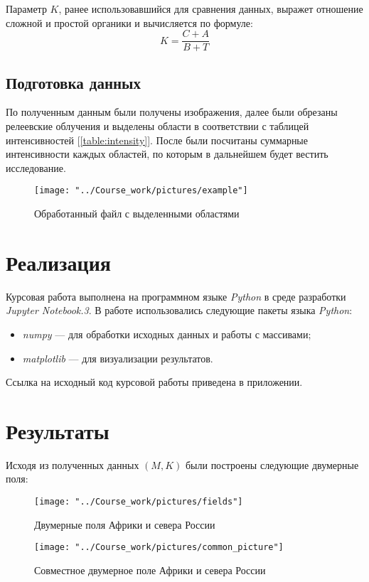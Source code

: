 \documentclass[12pt,a4paper]{article}
\begin{document}
		Параметр $K$, ранее использовавшийся для сравнения данных, выражет отношение сложной и простой органики и вычисляется по формуле:
		\begin{equation}\label{eqn:K}
			K = \frac{C+A}{B+T}
		\end{equation}
	
		\subsection {Подготовка данных}
		По полученным данным были получены изображения, далее были обрезаны релеевские облучения и выделены области в соответствии с таблицей интенсивностей [\ref{table:intensity}]. После были посчитаны суммарные интенсивности каждых областей, по которым в дальнейшем будет вестить исследование.
		\begin{figure}[H]
			\texttt{[image: "../Course\_work/pictures/example"]} 
			\caption[Обработанный файл с выделенными областями]{Обработанный файл с выделенными областями}
		\end{figure}
	
	\section{Реализация}
		Курсовая работа выполнена на программном языке \emph{Python} в среде разработки \emph{Jupyter Notebook.3}. В работе использовались следующие пакеты языка \emph{Python}:
		\begin{itemize}
			\item \emph{numpy} --- для обработки исходных данных и работы с массивами;
			
			\item \emph{matplotlib} --- для визуализации результатов.
		\end{itemize}
		Ссылка на исходный код курсовой работы приведена в приложении.
		
	\newpage
	\section{Результаты}
		Исходя из полученных данных $(M, K)$ были построены следующие двумерные поля:
		\begin{figure}[H]
			\texttt{[image: "../Course\_work/pictures/fields"]} 
			\caption[Двумерные поля Африки и севера России]{Двумерные поля Африки и севера России}
		\end{figure}
	
		\begin{figure}[H]
			\texttt{[image: "../Course\_work/pictures/common\_picture"]} 
			\caption[Совместное двумерное поле Африки и севера России]{Совместное двумерное поле Африки и севера России}
		\end{figure}
	
\end{document}
